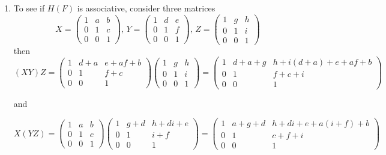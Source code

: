 \documentclass[12pt]{article}
\begin{document}
\begin{solution}
\begin{enumerate}
        \item To see if $H(F)$ is associative, consider three matrices \[X = \begin{pmatrix}
            1 & a & b \\ 0 & 1 & c \\ 0 & 0 & 1
        \end{pmatrix}, \,Y = \begin{pmatrix}
            1 & d & e \\ 0 & 1 & f \\ 0 & 0 & 1
        \end{pmatrix}, \,Z = \begin{pmatrix}
            1 & g & h \\ 0 & 1 & i \\ 0 & 0 & 1
        \end{pmatrix}\]
        then
        \[(XY)Z =\begin{pmatrix}
            1 & d + a & e + af + b \\ 0 & 1 & f+c \\ 0 & 0 & 1
        \end{pmatrix}\begin{pmatrix}
            1 & g & h \\ 0 & 1 & i \\ 0 & 0 & 1
        \end{pmatrix} = \begin{pmatrix}
            1 & d + a + g & h + i(d + a) + e + af + b \\ 0 & 1 & f+c + i\\ 0 & 0 & 1
        \end{pmatrix} \]

        and 

        \[X(YZ) =\begin{pmatrix}
            1 & a & b \\ 0 & 1 & c \\ 0 & 0 & 1
        \end{pmatrix}\begin{pmatrix}
            1 & g + d & h + di + e \\ 0 & 1 & i + f \\ 0 & 0 & 1
        \end{pmatrix} = \begin{pmatrix}
            1 & a + g + d & h + di + e + a(i+f) + b \\ 0 & 1 & c + f + i\\ 0 & 0 & 1
        \end{pmatrix} \]


\end{enumerate}
\end{solution}
\end{document}
